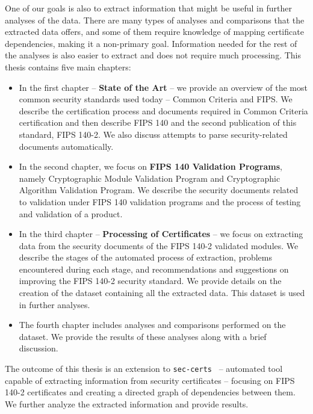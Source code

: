 One of our goals is also to extract information that might be useful in further analyses of the data. There are many types of analyses and comparisons that the extracted data offers, and some of them require knowledge of mapping certificate dependencies, making it a non-primary goal. Information needed for the rest of the analyses is also easier to extract and does not require much processing.
\newpage
This thesis contains five main chapters:
\begin{itemize}
    \item In the first chapter -- \textbf{State of the Art} -- we provide an overview of the most common security standards used today -- Common Criteria and FIPS. We describe the certification process and documents required in Common Criteria certification and then describe FIPS 140 and the second publication of this standard, FIPS 140-2. We also discuss attempts to parse security-related documents automatically.
    \item In the second chapter, we focus on \textbf{FIPS 140 Validation Programs}, namely Cryptographic Module Validation Program and Cryptographic Algorithm Validation Program. We describe the security documents related to validation under FIPS 140 validation programs and the process of testing and validation of a product. 
    \item In the third chapter -- \textbf{Processing of Certificates} -- we focus on extracting data from the security documents of the FIPS 140-2 validated modules. We describe the stages of the automated process of extraction, problems encountered during each stage, and recommendations and suggestions on improving the FIPS 140-2 security standard. We provide details on the creation of the dataset containing all the extracted data. This dataset is used in further analyses.
    \item The fourth chapter includes analyses and comparisons performed on the dataset. We provide the results of these analyses along with a brief discussion.
\end{itemize}

The outcome of this thesis is an extension to \texttt{sec-certs}~\cite{sec-certs} -- automated tool capable of extracting information from security certificates -- focusing on FIPS 140-2 certificates and creating a directed graph of dependencies between them. We further analyze the extracted information and provide results.